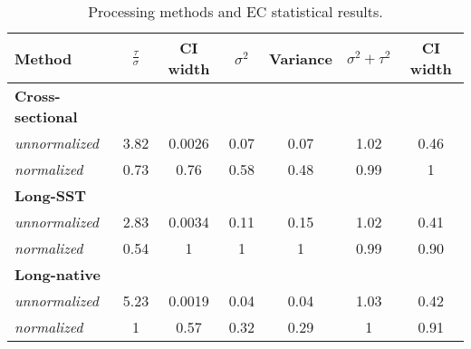 
\begin{table}[h!]
\centering
\caption{Processing methods and EC statistical results.}
\begin{tabular*}{0.95\textwidth}{@{\extracolsep{\fill}} lcc|cc|cc}
\hline
Method & $\frac{\tau}{\sigma}$ & CI width\footnotemark[1] & $\sigma^2$ & Variance\footnotemark[2] & $\sigma^2 + \tau^2$ & CI width\footnotemark[3] \\
\hline
\bf{Cross-sectional} &&&&&& \\
\quad \emph{unnormalized} & 3.82 & 0.0026  & 0.07 & 0.07 & 1.02 & \cellcolor{red} 0.46  \\
\quad \emph{normalized}   & 0.73 & 0.76  & 0.58 & 0.48 & 0.99 & \cellcolor{red} 1 \\
\bf{Long-SST} &&&&&& \\
\quad \emph{unnormalized}  & \cellcolor{red} 2.83 & \cellcolor{red} 0.0034 & \cellcolor{red} 0.11 &\cellcolor{red} 0.15 & \cellcolor{green} 1.02 & \cellcolor{green} 0.41 \\
\quad \emph{normalized}   & \cellcolor{red} 0.54 & \cellcolor{red} 1 &\cellcolor{red} 1 &\cellcolor{red} 1 & \cellcolor{green} 0.99 & \cellcolor{green} 0.90 \\
\bf{Long-native} &&&&&& \\
 \quad \emph{unnormalized}  & \cellcolor{green} 5.23 & \cellcolor{green} 0.0019 & \cellcolor{green} 0.04 & \cellcolor{green} 0.04 & \cellcolor{red} 1.03 & 0.42 \\
 \quad \emph{normalized}   & \cellcolor{green} 1 & \cellcolor{green} 0.57 & \cellcolor{green} 0.32 & \cellcolor{green} 0.29 & \cellcolor{red} 1 & 0.91 \\
\hline
\end{tabular*}
\label{table:res_tab}
\end{table}

